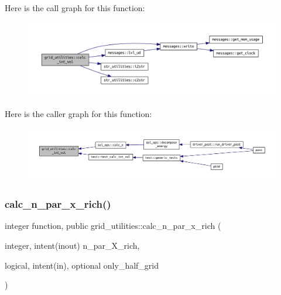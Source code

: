 Here is the call graph for this function\+:\nopagebreak
\begin{figure}[H]
\begin{center}
\leavevmode
\includegraphics[width=350pt]{namespacegrid__utilities_a97e3106dbdc10b726af74afa113ba533_cgraph}
\end{center}
\end{figure}
Here is the caller graph for this function\+:\nopagebreak
\begin{figure}[H]
\begin{center}
\leavevmode
\includegraphics[width=350pt]{namespacegrid__utilities_a97e3106dbdc10b726af74afa113ba533_icgraph}
\end{center}
\end{figure}
\mbox{\label{namespacegrid__utilities_adeb8c22db4d419a278d6fcc68a34100c}} 
\subsubsection{\texorpdfstring{calc\+\_\+n\+\_\+par\+\_\+x\+\_\+rich()}{calc\_n\_par\_x\_rich()}}
{\footnotesize\ttfamily integer function, public grid\+\_\+utilities\+::calc\+\_\+n\+\_\+par\+\_\+x\+\_\+rich (\begin{DoxyParamCaption}\item[{integer, intent(inout)}]{n\+\_\+par\+\_\+\+X\+\_\+rich,  }\item[{logical, intent(in), optional}]{only\+\_\+half\+\_\+grid }\end{DoxyParamCaption})}



